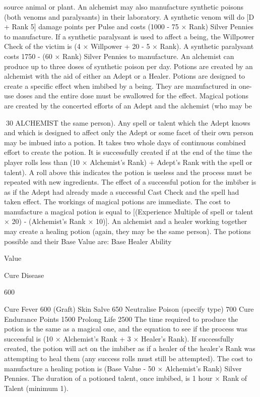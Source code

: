 \documentclass[a4paper]{article}
\begin{document}
\begin{multicols}{3}
source animal or plant.
An alchemist may also manufacture synthetic
poisons (both venoms and paralysants) in their
laboratory. A synthetic venom will do [D + Rank 5] damage points per Pulse and costs (1000 - 75 ×
Rank) Silver Pennies to manufacture. If a synthetic
paralysant is used to affect a being, the Willpower
Check of the victim is (4 × Willpower + 20 - 5 ×
Rank). A synthetic paralysant costs 1750 - (60 ×
Rank) Silver Pennies to manufacture. An alchemist
can produce up to three doses of synthetic poison
per day.
Potions are created by an alchemist with the aid
of either an Adept or a Healer.
Potions are designed to create a specific effect
when imbibed by a being. They are manufactured
in one-use doses and the entire dose must be swallowed for the effect.
Magical potions are created by the concerted efforts of an Adept and the alchemist (who may be

30 ALCHEMIST
the same person). Any spell or talent which the
Adept knows and which is designed to affect only
the Adept or some facet of their own person may
be imbued into a potion. It takes two whole days of
continuous combined effort to create the potion. It
is successfully created if at the end of the time the
player rolls less than (10 × Alchemist’s Rank) +
Adept’s Rank with the spell or talent). A roll above
this indicates the potion is useless and the process
must be repeated with new ingredients. The effect
of a successful potion for the imbiber is as if the
Adept had already made a successful Cast Check
and the spell had taken effect. The workings of
magical potions are immediate. The cost to manufacture a magical potion is equal to [(Experience
Multiple of spell or talent × 20) - (Alchemist’s
Rank × 10)].
An alchemist and a healer working together may
create a healing potion (again, they may be the
same person). The potions possible and their Base
Value are:
Base Healer Ability

Value

Cure Disease

600

Cure Fever
600
(Graft) Skin Salve
650
Neutralise Poison (specify type) 700
Cure Endurance Points
1500
Prolong Life
2500
The time required to produce the potion is the same
as a magical one, and the equation to see if the
process was successful is (10 × Alchemist’s Rank
+ 3 × Healer’s Rank). If successfully created, the
potion will act on the imbiber as if a healer of the
healer’s Rank was attempting to heal them (any
success rolls must still be attempted). The cost to
manufacture a healing potion is (Base Value - 50 ×
Alchemist’s Rank) Silver Pennies.
The duration of a potioned talent, once imbibed, is
1 hour × Rank of Talent (minimum 1).


\end{multicols}
\end{document}
